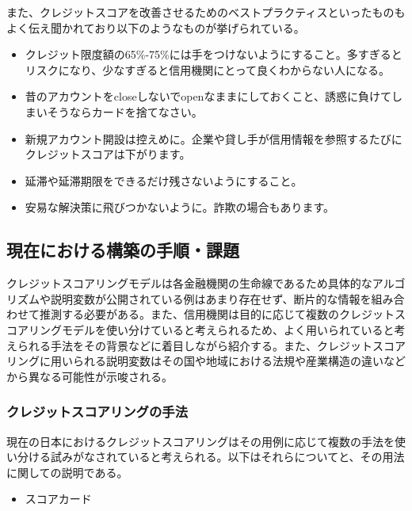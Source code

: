 \documentclass[11pt]{jsarticle}
\providecommand{\tightlist}{%
      \setlength{\itemsep}{0pt}\setlength{\parskip}{0pt}}
\begin{document}
また、クレジットスコアを改善させるためのベストプラクティスといったものもよく伝え聞かれており以下のようなものが挙げられている\cite{annuity2}。

\begin{itemize}
\tightlist
\item
  クレジット限度額の65\%-75\%には手をつけないようにすること。多すぎるとリスクになり、少なすぎると信用機関にとって良くわからない人になる。
\item
  昔のアカウントをcloseしないでopenなままにしておくこと、誘惑に負けてしまいそうならカードを捨てなさい。
\item
  新規アカウント開設は控えめに。企業や貸し手が信用情報を参照するたびにクレジットスコアは下がります。
\item
  延滞や延滞期限をできるだけ残さないようにすること。
\item
  安易な解決策に飛びつかないように。詐欺の場合もあります。
\end{itemize}

    \subsection{現在における構築の手順・課題}\label{ux73feux5728ux306bux304aux3051ux308bux69cbux7bc9ux306eux624bux9806ux8ab2ux984c}

    クレジットスコアリングモデルは各金融機関の生命線であるため具体的なアルゴリズムや説明変数が公開されている例はあまり存在せず、断片的な情報を組み合わせて推測する必要がある。また、信用機関は目的に応じて複数のクレジットスコアリングモデルを使い分けていると考えられるため\cite{fujitsu}、よく用いられていると考えられる手法をその背景などに着目しながら紹介する。また、クレジットスコアリングに用いられる説明変数はその国や地域における法規や産業構造の違いなどから異なる可能性が示唆される\cite{kirill1}。

    \subsubsection{クレジットスコアリングの手法}\label{ux30afux30ecux30b8ux30c3ux30c8ux30b9ux30b3ux30a2ux30eaux30f3ux30b0ux306eux624bux6cd5}

    現在の日本におけるクレジットスコアリングはその用例に応じて複数の手法を使い分ける試みがなされていると考えられる\cite{fujitsu}。以下はそれらについてと、その用法に関しての説明である。

\begin{itemize}
\tightlist
\item
  スコアカード
\end{itemize}
\end{document}
